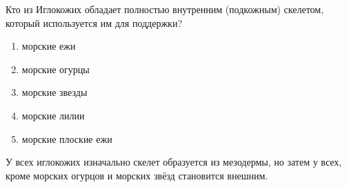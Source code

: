 
Кто из Иглокожих обладает полностью внутренним (подкожным) скелетом,
который используется им для поддержки?

\begin{enumerate}
    \item морские ежи
    \item морские огурцы
    \item морские звезды 
    \item морские лилии 
    \item морские плоские ежи
\end{enumerate}

\explanationSection

У всех иглокожих изначально скелет образуется из мезодермы, но затем у всех, кроме морских огурцов и морских звёзд становится внешним.

